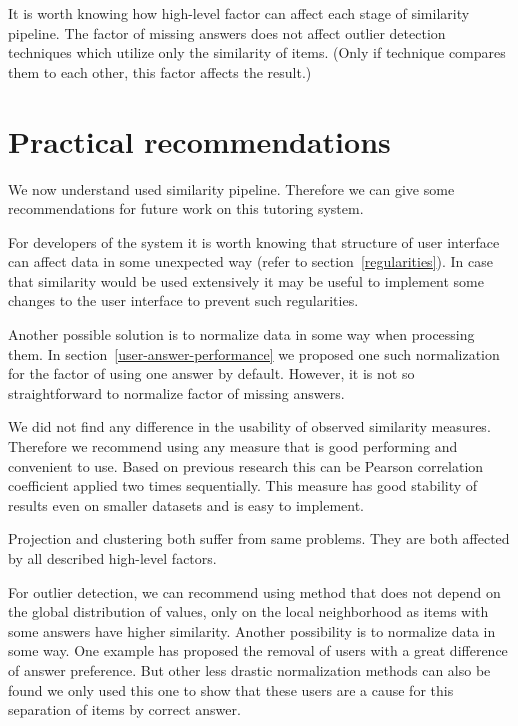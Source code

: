 \documentclass[
  printed, %
  table,   %
  nolof,     %
  nolot,     %
  color,
  final,
  nocover
]{fithesis3}
\begin{document}
It is worth knowing how high-level factor can affect each stage of similarity pipeline. The factor of missing answers does not affect outlier detection techniques which utilize only the similarity of items. (Only if technique compares them to each other, this factor affects the result.)


\section{Practical recommendations}\label{practical-recommendations}

We now understand used similarity pipeline. Therefore we can give some recommendations for future work on this tutoring system.


For developers of the system it is worth knowing that structure of user interface can affect data in some unexpected way (refer to section~\ref{regularities}). In case that similarity would be used extensively it may be useful to implement some changes to the user interface to prevent such regularities.


Another possible solution is to normalize data in some way when processing them. In section~\ref{user-answer-performance} we proposed one such normalization for the factor of using one answer by default. However, it is not so straightforward to normalize factor of missing answers.


We did not find any difference in the usability of observed similarity measures. Therefore we recommend using any measure that is good performing and convenient to use. Based on previous research this can be Pearson correlation coefficient applied two times sequentially. This measure has good stability of results even on smaller datasets and is easy to implement.


Projection and clustering both suffer from same problems. They are both affected by all described high-level factors.


For outlier detection, we can recommend using method that does not depend on the global distribution of values, only on the local neighborhood as items with some answers have higher similarity. Another possibility is to normalize data in some way. One example has proposed the removal of users with a great difference of answer preference. But other less drastic normalization methods can also be found we only used this one to show that these users are a cause for this separation of items by correct answer.
\end{document}
